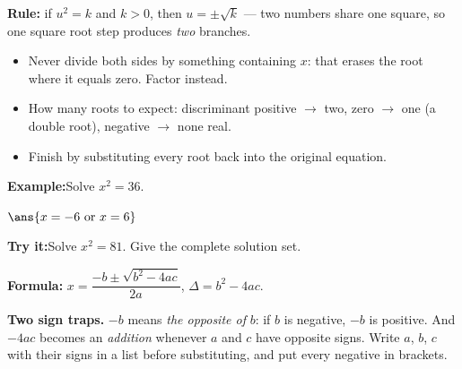 \documentclass[12pt]{article}
\begin{document}


\begin{formulabox}
\textbf{Rule:} if $u^2 = k$ and $k > 0$, then $u = \pm\sqrt{k}$ --- two numbers
share one square, so one square root step produces \emph{two} branches.
\begin{itemize}[leftmargin=0.8cm, itemsep=1pt, topsep=2pt]
  \item Never divide both sides by something containing $x$: that erases the root
        where it equals zero. Factor instead.
  \item How many roots to expect: discriminant positive $\rightarrow$ two,
        zero $\rightarrow$ one (a double root), negative $\rightarrow$ none real.
  \item Finish by substituting every root back into the original equation.
\end{itemize}
\end{formulabox}

\begin{examplebox}
\textbf{Example:}\quad Solve $x^2 = 36$.

$\ans{x = -6 \text{ or } x = 6}$
\end{examplebox}

\begin{tryitbox}
\textbf{Try it:}\quad Solve $x^2 = 81$. Give the complete solution set.\\[2pt]
\end{tryitbox}


\begin{formulabox}
\textbf{Formula:} $x = \dfrac{-b \pm \sqrt{b^2 - 4ac}}{2a}$, \quad
$\Delta = b^2 - 4ac$.\par
\smallskip
\textbf{Two sign traps.} $-b$ means \emph{the opposite of} $b$: if $b$ is
negative, $-b$ is positive. And $-4ac$ becomes an \emph{addition} whenever $a$
and $c$ have opposite signs. Write $a$, $b$, $c$ with their signs in a list
before substituting, and put every negative in brackets.
\end{formulabox}
\end{document}

